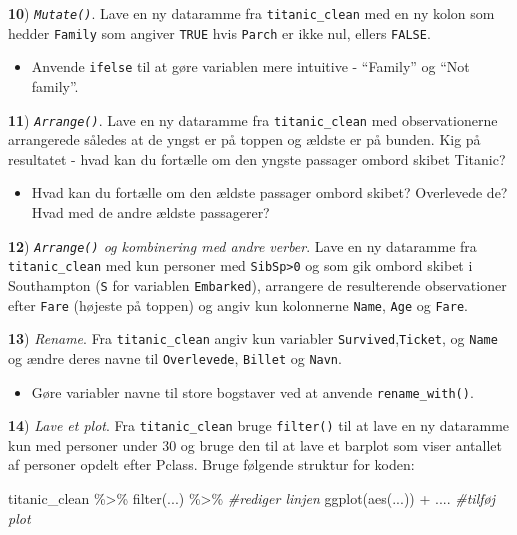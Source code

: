 \documentclass[
]{book}
\newenvironment{Shaded}{\begin{snugshade}}{\end{snugshade}}
\newcommand{\CommentTok}[1]{\textcolor[rgb]{0.56,0.35,0.01}{\textit{#1}}}
\newcommand{\FunctionTok}[1]{\textcolor[rgb]{0.00,0.00,0.00}{#1}}
\newcommand{\NormalTok}[1]{#1}
\newcommand{\SpecialCharTok}[1]{\textcolor[rgb]{0.00,0.00,0.00}{#1}}
\providecommand{\tightlist}{%
  \setlength{\itemsep}{0pt}\setlength{\parskip}{0pt}}
\begin{document}
\textbf{10}) \emph{\texttt{Mutate()}}. Lave en ny dataramme fra \texttt{titanic\_clean} med en ny kolon som hedder \texttt{Family} som angiver \texttt{TRUE} hvis \texttt{Parch} er ikke nul, ellers \texttt{FALSE}.

\begin{itemize}
\tightlist
\item
  Anvende \texttt{ifelse} til at gøre variablen mere intuitive - ``Family'' og ``Not family''.
\end{itemize}

\textbf{11}) \emph{\texttt{Arrange()}}. Lave en ny dataramme fra \texttt{titanic\_clean} med observationerne arrangerede således at de yngst er på toppen og ældste er på bunden. Kig på resultatet - hvad kan du fortælle om den yngste passager ombord skibet Titanic?

\begin{itemize}
\tightlist
\item
  Hvad kan du fortælle om den ældste passager ombord skibet? Overlevede de? Hvad med de andre ældste passagerer?
\end{itemize}

\textbf{12}) \emph{\texttt{Arrange()} og kombinering med andre verber}. Lave en ny dataramme fra \texttt{titanic\_clean} med kun personer med \texttt{SibSp\textgreater{}0} og som gik ombord skibet i Southampton (\texttt{S} for variablen \texttt{Embarked}), arrangere de resulterende observationer efter \texttt{Fare} (højeste på toppen) og angiv kun kolonnerne \texttt{Name}, \texttt{Age} og \texttt{Fare}.

\textbf{13}) \emph{Rename}. Fra \texttt{titanic\_clean} angiv kun variabler \texttt{Survived},\texttt{Ticket}, og \texttt{Name} og ændre deres navne til \texttt{Overlevede}, \texttt{Billet} og \texttt{Navn}.

\begin{itemize}
\tightlist
\item
  Gøre variabler navne til store bogstaver ved at anvende \texttt{rename\_with()}.
\end{itemize}

\textbf{14}) \emph{Lave et plot}. Fra \texttt{titanic\_clean} bruge \texttt{filter()} til at lave en ny dataramme kun med personer under 30 og bruge den til at lave et barplot som viser antallet af personer opdelt efter Pclass. Bruge følgende struktur for koden:

\begin{Shaded}
\begin{Highlighting}[]
\NormalTok{titanic\_clean }\SpecialCharTok{\%\textgreater{}\%} 
  \FunctionTok{filter}\NormalTok{(...) }\SpecialCharTok{\%\textgreater{}\%} \CommentTok{\#rediger linjen}
  \FunctionTok{ggplot}\NormalTok{(}\FunctionTok{aes}\NormalTok{(...)) }\SpecialCharTok{+}\NormalTok{ .... }\CommentTok{\#tilføj plot}
\end{Highlighting}
\end{Shaded}
\end{document}
